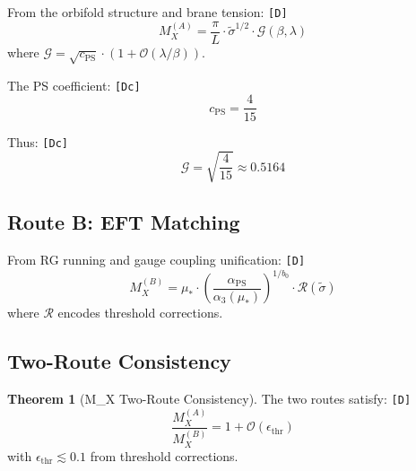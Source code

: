 \documentclass[11pt,a4paper]{article}
\newcommand{\tagD}{\textcolor{green!50!black}{\texttt{[D]}}}
\newcommand{\tagDc}{\textcolor{blue!70!black}{\texttt{[Dc]}}}
\theoremstyle{definition}
\newtheorem{theorem}{Theorem}[section]
\begin{document}
\begin{routebox}
From the orbifold structure and brane tension: \tagD{}
\begin{equation}
\label{eq:route-a-derivation}
M_X^{(A)} = \frac{\pi}{L} \cdot \tilde{\sigma}^{1/2} \cdot \mathcal{G}(\beta, \lambda)
\end{equation}
where $\mathcal{G} = \sqrt{c_{\text{PS}}} \cdot (1 + \mathcal{O}(\lambda/\beta))$.
\end{routebox}

The PS coefficient: \tagDc{}
\begin{equation}
\label{eq:cps-value}
c_{\text{PS}} = \frac{4}{15}
\end{equation}

Thus: \tagDc{}
\begin{equation}
\label{eq:G-value}
\mathcal{G} = \sqrt{\frac{4}{15}} \approx 0.5164
\end{equation}

\subsection{Route B: EFT Matching}
\label{subsec:route-b}

\begin{routebox}
From RG running and gauge coupling unification: \tagD{}
\begin{equation}
\label{eq:route-b-derivation}
M_X^{(B)} = \mu_* \cdot \left(\frac{\alpha_{\text{PS}}}{\alpha_3(\mu_*)}\right)^{1/b_0} \cdot \mathcal{R}(\tilde{\sigma})
\end{equation}
where $\mathcal{R}$ encodes threshold corrections.
\end{routebox}

\subsection{Two-Route Consistency}
\label{subsec:mx-consistency}

\begin{theorem}[M\_X Two-Route Consistency]
\label{thm:mx-consistency}
The two routes satisfy: \tagD{}
\begin{equation}
\label{eq:mx-consistency}
\frac{M_X^{(A)}}{M_X^{(B)}} = 1 + \mathcal{O}(\epsilon_{\text{thr}})
\end{equation}
with $\epsilon_{\text{thr}} \lesssim 0.1$ from threshold corrections.
\end{theorem}
\end{document}
